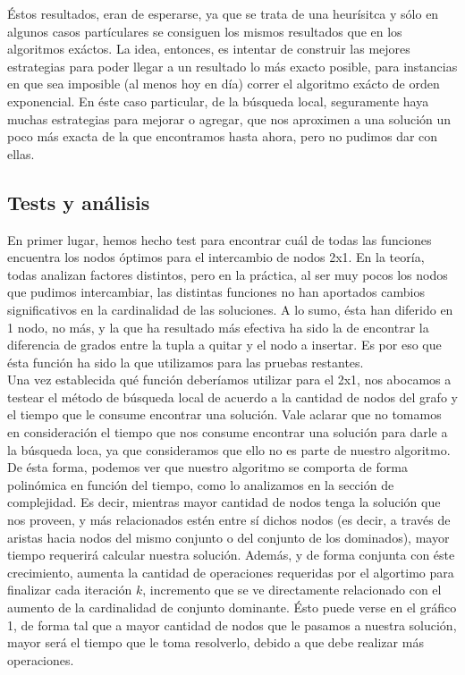 Éstos resultados, eran de esperarse, ya que se trata de una heurísitca y sólo en algunos casos partículares se consiguen los mismos resultados que en los algoritmos exáctos. La idea, entonces, es intentar de construir las mejores estrategias para poder llegar a un resultado lo más exacto posible, para instancias en que sea imposible (al menos hoy en día) correr el algoritmo exácto de orden exponencial. En éste caso particular, de la búsqueda local, seguramente haya muchas estrategias para mejorar o agregar, que nos aproximen a una solución un poco más exacta de la que encontramos hasta ahora, pero no pudimos dar con ellas.


\subsection{Tests y análisis}
En primer lugar, hemos hecho test para encontrar cuál de todas las funciones encuentra los nodos óptimos para el intercambio de nodos 2x1. En la teoría, todas analizan factores distintos, pero en la práctica, al ser muy pocos los nodos que pudimos intercambiar, las distintas funciones no han aportados cambios significativos en la cardinalidad de las soluciones. A lo sumo, ésta han diferido en 1 nodo, no más, y la que ha resultado más efectiva ha sido la de encontrar la diferencia de grados entre la tupla a quitar y el nodo a insertar. Es por eso que ésta función ha sido la que utilizamos para las pruebas restantes. \\
Una vez establecida qué función deberíamos utilizar para el 2x1, nos abocamos a testear el método de búsqueda local de acuerdo a la cantidad de nodos del grafo y el tiempo que le consume encontrar una solución. Vale aclarar que no tomamos en consideración el tiempo que nos consume encontrar una solución para darle a la búsqueda loca, ya que consideramos que ello no es parte de nuestro algoritmo. De ésta forma, podemos ver que nuestro algoritmo se comporta de forma polinómica en función del tiempo, como lo analizamos en la sección de complejidad. Es decir, mientras mayor cantidad de nodos tenga la solución que nos proveen, y más relacionados estén entre sí dichos nodos (es decir, a través de aristas hacia nodos del mismo conjunto o del conjunto de los dominados), mayor tiempo requerirá calcular nuestra solución. Además, y de forma conjunta con éste crecimiento, aumenta la cantidad de operaciones requeridas por el algortimo para finalizar cada iteración $k$, incremento que se ve directamente relacionado con el aumento de la cardinalidad de conjunto dominante. Ésto puede verse en el gráfico 1, de forma tal que a mayor cantidad de nodos que le pasamos a nuestra solución, mayor será el tiempo que le toma resolverlo, debido a que debe realizar más operaciones.

